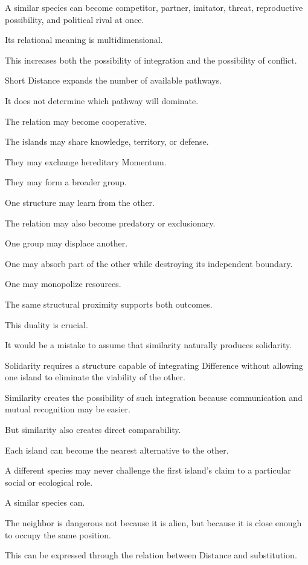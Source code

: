 A similar species can become competitor, partner, imitator, threat, reproductive possibility, and political rival at once.

Its relational meaning is multidimensional.

This increases both the possibility of integration and the possibility of conflict.

Short Distance expands the number of available pathways.

It does not determine which pathway will dominate.

The relation may become cooperative.

The islands may share knowledge, territory, or defense.

They may exchange hereditary Momentum.

They may form a broader group.

One structure may learn from the other.

The relation may also become predatory or exclusionary.

One group may displace another.

One may absorb part of the other while destroying its independent boundary.

One may monopolize resources.

The same structural proximity supports both outcomes.

This duality is crucial.

It would be a mistake to assume that similarity naturally produces solidarity.

Solidarity requires a structure capable of integrating Difference without allowing one island to eliminate the viability of the other.

Similarity creates the possibility of such integration because communication and mutual recognition may be easier.

But similarity also creates direct comparability.

Each island can become the nearest alternative to the other.

A different species may never challenge the first island’s claim to a particular social or ecological role.

A similar species can.

The neighbor is dangerous not because it is alien, but because it is close enough to occupy the same position.

This can be expressed through the relation between Distance and substitution.

